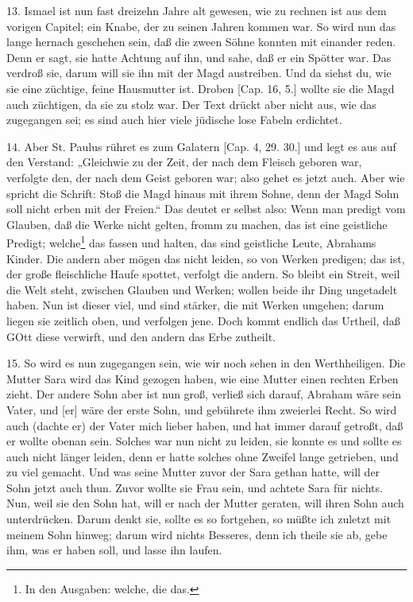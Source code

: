 13. Ismael ist nun fast dreizehn Jahre alt gewesen, wie zu rechnen ist aus dem vorigen Capitel; ein Knabe, der zu seinen Jahren kommen war. So wird nun das lange hernach geschehen sein, daß die zween Söhne konnten mit einander reden. Denn er sagt, sie hatte Achtung auf ihn, und sahe, daß er ein Spötter war. Das verdroß sie, darum will sie ihn mit der Magd austreiben. Und da siehst du, wie sie eine züchtige, feine Hausmutter ist. Droben [Cap. 16, 5.] wollte sie die Magd auch züchtigen, da sie zu stolz war. Der Text drückt aber nicht aus, wie das zugegangen sei; es sind auch hier viele jüdische lose Fabeln erdichtet.

14. Aber St. Paulus rühret es zum Galatern [Cap. 4, 29. 30.] und legt es aus auf den Verstand: „Gleichwie zu der Zeit, der nach dem Fleisch geboren war, verfolgte den, der nach dem Geist geboren war; also gehet es jetzt auch. Aber wie spricht die Schrift: Stoß die Magd hinaus mit ihrem Sohne, denn der Magd Sohn soll nicht erben mit der Freien.“ Das deutet er selbst also: Wenn man predigt vom Glauben, daß die Werke nicht gelten, fromm zu machen, das ist eine geistliche Predigt; welche\footnote{In den Ausgaben: welche, die das.} das fassen und halten, das sind geistliche Leute, Abrahams Kinder. Die andern aber mögen das nicht leiden, so von Werken predigen; das ist, der große fleischliche Haufe spottet, verfolgt die andern. So bleibt ein Streit, weil die Welt steht, zwischen Glauben und Werken; wollen beide ihr Ding ungetadelt haben. Nun ist dieser viel, und sind stärker, die mit Werken umgehen; darum liegen sie zeitlich oben, und verfolgen jene. Doch kommt endlich das Urtheil, daß GOtt diese verwirft, und den andern das Erbe zutheilt.

15. So wird es nun zugegangen sein, wie wir noch sehen in den Werthheiligen. Die Mutter Sara wird das Kind gezogen haben, wie eine Mutter einen rechten Erben zieht. Der andere Sohn aber ist nun groß, verließ sich darauf, Abraham wäre sein Vater, und [er] wäre der erste Sohn, und gebührete ihm zweierlei Recht. So wird auch (dachte er) der Vater mich lieber haben, und hat immer darauf getroßt, daß er wollte obenan sein. Solches war nun nicht zu leiden, sie konnte es und sollte es auch nicht länger leiden, denn er hatte solches ohne Zweifel lange getrieben, und zu viel gemacht. Und was seine Mutter zuvor der Sara gethan hatte, will der Sohn jetzt auch thun. Zuvor wollte sie Frau sein, und achtete Sara für nichts. Nun, weil sie den Sohn hat, will er nach der Mutter geraten, will ihren Sohn auch unterdrücken. Darum denkt sie, sollte es so fortgehen, so müßte ich zuletzt mit meinem Sohn hinweg; darum wird nichts Besseres, denn ich theile sie ab, gebe ihm, was er haben soll, und lasse ihn laufen.

